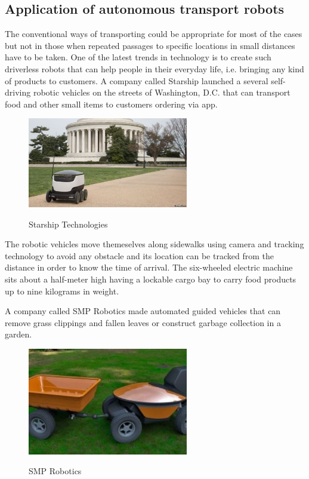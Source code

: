 \documentclass[12pt,english]{article}
\begin{document}
\subsection{Application of autonomous transport robots}
The conventional ways of transporting could be appropriate for most of the cases but not in those when repeated passages to specific locations in small distances have to be taken.
One of the latest trends in technology is to create such driverless robots that can help people in their everyday life, i.e. bringing any kind of products to customers. A company called Starship launched a several self-driving robotic vehicles on the streets of Washington, D.C. that can transport food and other small items to customers ordering via app.
\begin{figure}[h]
	\centering
	\includegraphics[width=7cm]{figures/starship.jpg}
	\label{fig1}
	\caption{Starship Technologies}
\end{figure}
The robotic vehicles move themeselves along sidewalks using camera and tracking technology to avoid any obstacle and its location can be tracked from the distance in order to know the time of arrival. The six-wheeled electric machine sits about a half-meter high having a lockable cargo bay to carry food products up to nine kilograms in weight.\cite{starship}




A company called SMP Robotics made automated guided vehicles that can remove grass clippings and fallen leaves or construct garbage collection in a garden. 
\begin{figure}[h]
	\centering
	\includegraphics[width=7cm]{figures/smp.jpg}
	\label{smp}
	\caption{SMP Robotics}
\end{figure}
\end{document}
